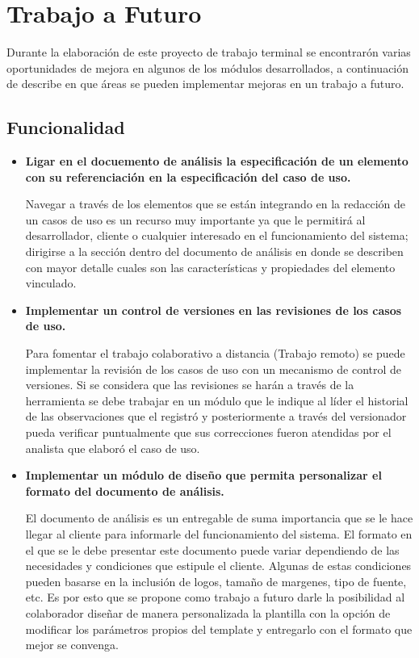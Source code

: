 \chapter{Trabajo a Futuro} \label{cap:once}
Durante la elaboración de este proyecto de trabajo terminal se encontrarón varias oportunidades de mejora en algunos de los módulos desarrollados, a continuación de describe en que áreas se pueden implementar mejoras en un trabajo a futuro.

\section{Funcionalidad}
\begin{itemize}
	
    \item \textbf {Ligar en el docuemento de análisis la especificación de un elemento con su referenciación en la especificación del caso de uso.}
    
    Navegar a través de los elementos que se están integrando en la redacción de un casos de uso es un recurso muy importante ya que le permitirá al desarrollador, cliente o cualquier interesado en el funcionamiento del sistema; dirigirse a la sección dentro del documento de análisis en donde se describen con mayor detalle cuales son las características y propiedades del elemento vinculado.
    
    \item \textbf {Implementar un control de versiones en las revisiones de los casos de uso.}
    
    Para fomentar el trabajo colaborativo a distancia (Trabajo remoto) se puede implementar la revisión de los casos de uso con un mecanismo de control de versiones. Si se considera que las revisiones se harán a través de la herramienta se debe trabajar en un módulo que le indique al líder el historial de las observaciones que el registró y posteriormente a través del versionador pueda verificar puntualmente que sus correcciones fueron atendidas por el analista que elaboró el caso de uso.
    
    \item \textbf {Implementar un módulo de diseño que permita personalizar el formato del documento de análisis.}
   
    El documento de análisis es un entregable de suma importancia que se le hace llegar al cliente para informarle del funcionamiento del sistema. El formato en el que se le debe presentar este documento puede variar dependiendo de las necesidades y condiciones que estipule el cliente. Algunas de estas condiciones pueden basarse en la inclusión de logos, tamaño de margenes, tipo de fuente, etc. Es por esto que se propone como trabajo a futuro darle la posibilidad al colaborador diseñar de manera personalizada la plantilla con la opción de modificar los parámetros propios del template y entregarlo con el formato que mejor se convenga.
    

\end{itemize}
